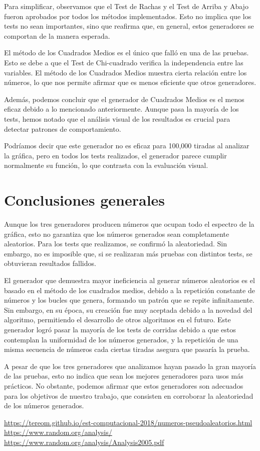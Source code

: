\documentclass{article}
\begin{document}
Para simplificar, observamos que el Test de Rachas y el Test de Arriba y Abajo fueron aprobados por todos los métodos implementados. Esto no implica que los tests no sean importantes, sino que reafirma que, en general, estos generadores se comportan de la manera esperada.

El método de los Cuadrados Medios es el único que falló en una de las pruebas. Esto se debe a que el Test de Chi-cuadrado verifica la independencia entre las variables. El método de los Cuadrados Medios muestra cierta relación entre los números, lo que nos permite afirmar que es menos eficiente que otros generadores.

Además, podemos concluir que el generador de Cuadrados Medios es el menos eficaz debido a lo mencionado anteriormente. Aunque pasa la mayoría de los tests, hemos notado que el análisis visual de los resultados es crucial para detectar patrones de comportamiento.

Podríamos decir que este generador no es eficaz para 100,000 tiradas al analizar la gráfica, pero en todos los tests realizados, el generador parece cumplir normalmente su función, lo que contrasta con la evaluación visual.

\section{Conclusiones generales}

Aunque los tres generadores producen números que ocupan todo el espectro de la gráfica, esto no garantiza que los números generados sean completamente aleatorios. Para los tests que realizamos, se confirmó la aleatoriedad. Sin embargo, no es imposible que, si se realizaran más pruebas con distintos tests, se obtuvieran resultados fallidos.

El generador que demuestra mayor ineficiencia al generar números aleatorios es el basado en el método de los cuadrados medios, debido a la repetición constante de números y los bucles que genera, formando un patrón que se repite infinitamente. Sin embargo, en su época, su creación fue muy aceptada debido a la novedad del algoritmo, permitiendo el desarrollo de otros algoritmos en el futuro. Este generador logró pasar la mayoría de los tests de corridas debido a que estos contemplan la uniformidad de los números generados, y la repetición de una misma secuencia de números cada ciertas tiradas asegura que pasaría la prueba.

A pesar de que los tres generadores que analizamos hayan pasado la gran mayoría de las pruebas, esto no indica que sean los mejores generadores para usos más prácticos. No obstante, podemos afirmar que estos generadores son adecuados para los objetivos de nuestro trabajo, que consisten en corroborar la aleatoriedad de los números generados.

  

\begin{thebibliography}{1}
     \url{https://tereom.github.io/est-computacional-2018/numeros-pseudoaleatorios.html}
     \url{https://www.random.org/analysis/}
     \url{https://www.random.org/analysis/Analysis2005.pdf}
\end{thebibliography}
\end{document}
